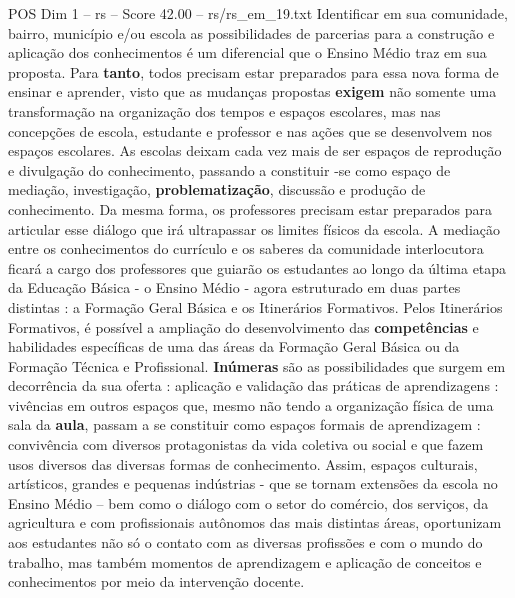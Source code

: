\begin{textsample}{POS Dim 1 – rs – Score 42.00 – rs/rs\_em\_19.txt}
Identificar em sua comunidade, bairro, município e/ou escola as possibilidades de parcerias para a construção e aplicação dos conhecimentos é um diferencial que o Ensino Médio traz em sua proposta.
Para \textbf{tanto}, todos precisam estar preparados para essa nova forma de ensinar e aprender, visto que as mudanças propostas \textbf{exigem} não somente uma transformação na organização dos tempos e espaços escolares, mas nas concepções de escola, estudante e professor e nas ações que se desenvolvem nos espaços escolares.
As escolas deixam cada vez mais de ser espaços de reprodução e divulgação do conhecimento, passando a constituir -se como espaço de mediação, investigação, \textbf{problematização}, discussão e produção de conhecimento.
Da mesma forma, os professores precisam estar preparados para articular esse diálogo que irá ultrapassar os limites físicos da escola.
A mediação entre os conhecimentos do currículo e os saberes da comunidade interlocutora ficará a cargo dos professores que guiarão os estudantes ao longo da última etapa da Educação Básica - o Ensino Médio - agora estruturado em duas partes distintas : a Formação Geral Básica e os Itinerários Formativos.
Pelos Itinerários Formativos, é possível a ampliação do desenvolvimento das \textbf{competências} e habilidades específicas de uma das áreas da Formação Geral Básica ou da Formação Técnica e Profissional. \textbf{Inúmeras} são as possibilidades que surgem em decorrência da sua oferta : aplicação e validação das práticas de aprendizagens : vivências em outros espaços que, mesmo não tendo a organização física de uma sala da \textbf{aula}, passam a se constituir como espaços formais de aprendizagem : convivência com diversos protagonistas da vida coletiva ou social e que fazem usos diversos das diversas formas de conhecimento.
Assim, espaços culturais, artísticos, grandes e pequenas indústrias - que se tornam extensões da escola no Ensino Médio – bem como o diálogo com o setor do comércio, dos serviços, da agricultura e com profissionais autônomos das mais distintas áreas, oportunizam aos estudantes não só o contato com as diversas profissões e com o mundo do trabalho, mas também momentos de aprendizagem e aplicação de conceitos e conhecimentos por meio da intervenção docente.

\end{textsample}
